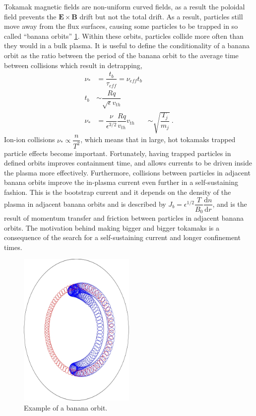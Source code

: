 \documentclass[10pt,a4paper]{article}
\begin{document}
	Tokamak magnetic fields are non-uniform curved fields, as a result the poloidal field prevents the $\bm{E} \times \bm{B}$ drift but not the total drift. As a result, particles still move away from the flux surfaces, causing some particles to be trapped in so called ``banana orbits'' \cref{f:banana}. Within these orbits, particles collide more often than they would in a bulk plasma. It is useful to define the conditionality of a banana orbit as the ratio between the period of the banana orbit to the average time between collisions which result in detrapping,
	\begin{align}
		\nu_{*} &= \dfrac{t_{b}}{\tau_{eff}} = \nu_{eff} t_{b}\\
		t_{b} &\sim \dfrac{R q}{\sqrt{\epsilon} v_{th}}\\
		\nu_{*} &= \dfrac{\nu}{\epsilon^{3/2}} \dfrac{Rq}{v_{th}}
		v_{th} &\sim \sqrt{\dfrac{T_j}{m_j}}~.
	\end{align}
	Ion-ion collisions $\nu_{*} \propto \dfrac{n}{T^2}$, which means that in large, hot tokamaks trapped particle effects become important. Fortunately, having trapped particles in defined orbits improves containment time, and allows currents to be driven inside the plasma more effectively. Furthermore, collisions between particles in adjacent banana orbits improve the in-plasma current even further in a self-sustaining fashion. This is the bootstrap current and it depends on the density of the plasma in adjacent banana orbits and is described by $J_{b} = \epsilon^{1/2} \dfrac{T}{B_{0}} \dfrac{\mathrm{d} n}{\mathrm{d} r}$, and is the result of momentum transfer and friction between particles in adjacent banana orbits. The motivation behind making bigger and bigger tokamaks is a consequence of the search for a self-sustaining current and longer confinement times.
	\begin{figure}
		\centering
		\includegraphics[width=0.5\textwidth]{banana.jpg}
		\caption{Example of a banana orbit.}
		\label{f:banana}
	\end{figure}
	
\end{document}
